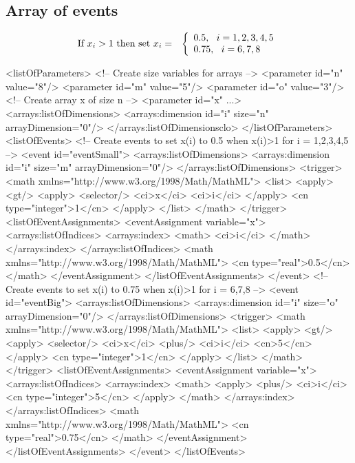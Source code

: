 \subsection{Array of events}

\begin{eqnarray*}
\textup{If }x_i > 1\textup{ then set }x_i & = & \left\{ \begin{array}{l}
0.5,~~i = 1,2,3,4,5 \\
0.75,~~i = 6,7,8
\end{array}
\right.
\end{eqnarray*}

\begin{example}
<listOfParameters>
 <!-- Create size variables for arrays -->
 <parameter id="n" value="8"/>
 <parameter id="m" value="5"/>
 <parameter id="o" value="3"/>
 <!-- Create array x of size n -->
 <parameter id="x" ...> 
  <arrays:listOfDimensions>
   <arrays:dimension id="i" size="n" arrayDimension="0"/>
  </arrays:listOfDimensionsclo>
</listOfParameters>
<listOfEvents>
 <!-- Create events to set x(i) to 0.5 when x(i)>1 for i = 1,2,3,4,5 -->
 <event id="eventSmall">
  <arrays:listOfDimensions>
   <arrays:dimension id="i" size="m" arrayDimension="0"/>
  </arrays:listOfDimensions>
  <trigger>
   <math xmlns="http://www.w3.org/1998/Math/MathML">
    <list>
     <apply>
      <gt/>
       <apply>
        <selector/>
        <ci>x</ci>
        <ci>i</ci>
       </apply>
      <cn type="integer">1</cn>
     </apply>
    </list>
   </math>
  </trigger>
  <listOfEventAssignments>
   <eventAssignment variable="x">
    <arrays:listOfIndices>
     <arrays:index>
      <math>
       <ci>i</ci>
      </math>
     </arrays:index>
    </arrays:listOfIndices>
    <math xmlns="http://www.w3.org/1998/Math/MathML">
     <cn type="real">0.5</cn>
    </math>
   </eventAssignment>
  </listOfEventAssignments>
 </event>
 <!-- Create events to set x(i) to 0.75 when x(i)>1 for i = 6,7,8 -->
 <event id="eventBig">
  <arrays:listOfDimensions>
   <arrays:dimension id="i" size="o" arrayDimension="0"/>
  </arrays:listOfDimensions>
  <trigger>
   <math xmlns="http://www.w3.org/1998/Math/MathML">
    <list>
     <apply>
      <gt/>
       <apply>
        <selector/>
        <ci>x</ci>
         <plus/>
          <ci>i</ci>
          <cn>5</cn>
       </apply>
      <cn type="integer">1</cn>
     </apply>
    </list>
   </math>
  </trigger>
  <listOfEventAssignments>
   <eventAssignment variable="x">
    <arrays:listOfIndices>
     <arrays:index>
      <math>
       <apply>
          <plus/>
          <ci>i</ci>
          <cn type="integer">5</cn>
       </apply> 
      </math>
     </arrays:index>
    </arrays:listOfIndices>
    <math xmlns="http://www.w3.org/1998/Math/MathML">
     <cn type="real">0.75</cn>
    </math>
   </eventAssignment>
  </listOfEventAssignments>
 </event>
</listOfEvents>
\end{example}

